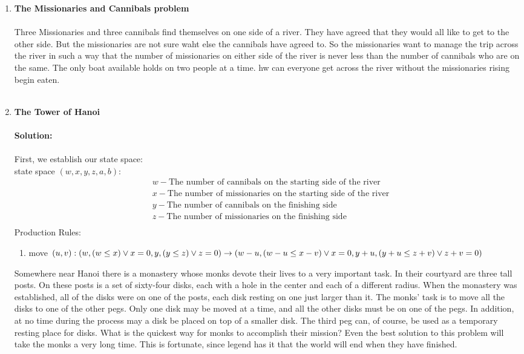 \documentclass[11pt]{article}
\begin{document}
\begin{enumerate}
\item \textbf{The Missionaries and Cannibals problem}\\\\
Three Missionaries and three cannibals find themselves on one side of a river. They have agreed that they would all like to get to the other side. But the missionaries are not sure waht else the cannibals have agreed to. So the missionaries want to manage the trip across the river in such a way that the number of missionaries on either side of the river is never less than the number of cannibals who are on the same. The only boat available holds on two people at a time. hw can everyone get across the river without the missionaries rising begin eaten. \\\\
\item \textbf{The Tower of Hanoi}\\\\
\textbf{Solution:}\\\\
First, we establish our state space: \\
state space $(w, x, y, z, a, b)$:
\begin{align*}
&w - \text{The number of cannibals on the starting side of the river}\\
&x - \text{The number of missionaries on the starting side of the river} \\
&y - \text{The number of cannibals on the finishing side} \\
&z - \text{The number of missionaries on the finishing side}\\
\end{align*}
Production Rules: 
\begin{enumerate}
\item  move $(u, v):\\
 (w, (w \leq x)  \vee x = 0, y, (y \leq z)  \vee z = 0) \rightarrow\\
 (w - u, (w - u \leq x - v)  \vee x = 0, y + u, (y + u \leq z + v)  \vee z + v = 0)$
\end{enumerate}
Somewhere near Hanoi there is a monastery whose monks devote their lives to
a very important task. In their courtyard are three tall posts. On these posts is a
set of sixty-four disks, each with a hole in the center and each of a different
radius. When the monastery was established, all of the disks were on one of the
posts, each disk resting on one just larger than it. The monks' task is to move
all the disks to one of the other pegs. Only one disk may be moved at a time,
and all the other disks must be on one of the pegs. In addition, at no time
during the process may a disk be placed on top of a smaller disk. The third peg
can, of course, be used as a temporary resting place for disks. What is the
quickest way for monks to accomplish their mission?
 Even the best solution to this problem will take the monks a very long time.
This is fortunate, since legend has it that the world will end when they have
finished.\\\\

\end{enumerate}
\end{document}
